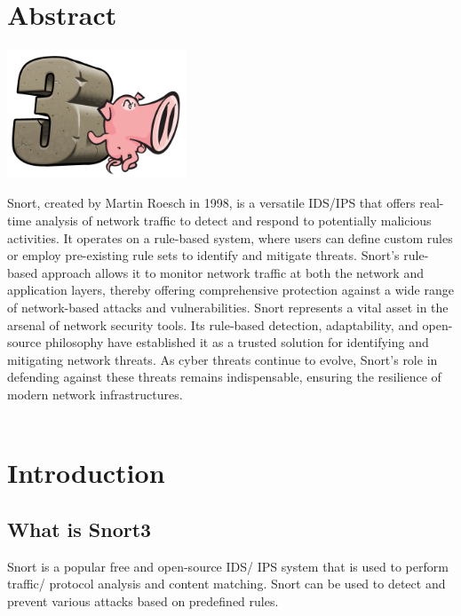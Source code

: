 \documentclass{article}
\begin{document}
\tableofcontents
	\thispagestyle{nofooter}
	\cleardoublepage
	\typeout{}

\pagebreak

\setcounter{page}{1}

\section{Abstract}
\label{sec:Abstract}
\begin{center}
\includegraphics[width=0.4\textwidth]{images/snort3_logo.png}  
\end{center}
\fontsize{18pt}{25pt}\selectfont Snort, created by Martin Roesch in 1998, is a versatile IDS/IPS that offers real-time analysis of network traffic to detect and respond to potentially malicious activities. It operates on a rule-based system, where users can define custom rules or employ pre-existing rule sets to identify and mitigate threats. Snort’s rule-based approach allows it to monitor network traffic at both the network and application layers, thereby offering comprehensive protection against a wide range of network-based attacks and vulnerabilities. Snort represents a vital asset in the arsenal of network security tools. Its rule-based detection, adaptability, and open-source philosophy have established it as a trusted solution for identifying and mitigating network threats. As cyber threats continue to evolve, Snort’s role in defending against these threats remains indispensable, ensuring the resilience of modern network infrastructures. \\\\
\clearpage

\section{Introduction}
\label{sec:Introduction}

\subsection{What is Snort3}
 Snort is a popular free and open-source IDS/ IPS system that is used to perform traffic/
 protocol analysis and content matching. Snort can be used to detect and prevent various
 attacks based on predefined rules.
 
\end{document}
